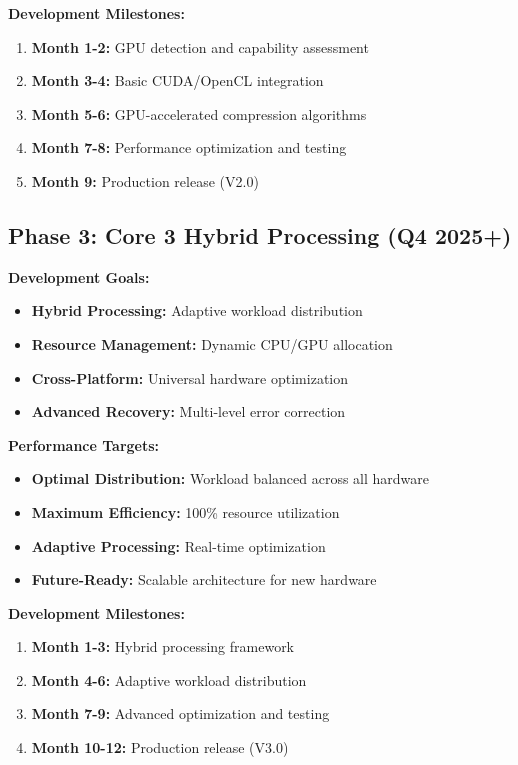 \documentclass[12pt,a4paper]{article}
\begin{document}
\textbf{Development Milestones:}
\begin{enumerate}
    \item \textbf{Month 1-2:} GPU detection and capability assessment
    \item \textbf{Month 3-4:} Basic CUDA/OpenCL integration
    \item \textbf{Month 5-6:} GPU-accelerated compression algorithms
    \item \textbf{Month 7-8:} Performance optimization and testing
    \item \textbf{Month 9:} Production release (V2.0)
\end{enumerate}

\subsection{Phase 3: Core 3 Hybrid Processing (Q4 2025+)}

\textbf{Development Goals:}
\begin{itemize}
    \item \textbf{Hybrid Processing:} Adaptive workload distribution
    \item \textbf{Resource Management:} Dynamic CPU/GPU allocation
    \item \textbf{Cross-Platform:} Universal hardware optimization
    \item \textbf{Advanced Recovery:} Multi-level error correction
\end{itemize}

\textbf{Performance Targets:}
\begin{itemize}
    \item \textbf{Optimal Distribution:} Workload balanced across all hardware
    \item \textbf{Maximum Efficiency:} 100\% resource utilization
    \item \textbf{Adaptive Processing:} Real-time optimization
    \item \textbf{Future-Ready:} Scalable architecture for new hardware
\end{itemize}

\textbf{Development Milestones:}
\begin{enumerate}
    \item \textbf{Month 1-3:} Hybrid processing framework
    \item \textbf{Month 4-6:} Adaptive workload distribution
    \item \textbf{Month 7-9:} Advanced optimization and testing
    \item \textbf{Month 10-12:} Production release (V3.0)
\end{enumerate}
\end{document}
